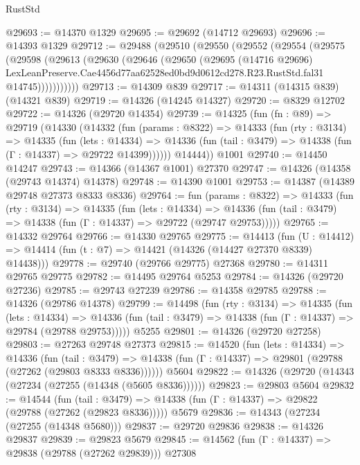 \begin{lexlean}{RustStd}
\begin{coremodule}
@29693 := @14370 @1329
@29695 := @29692 (@14712 @29693)
@29696 := @14393 @1329
@29712 := @29488
    (@29510
      (@29550
        (@29552
          (@29554
            (@29575
              (@29598
                (@29613
                  (@29630
                    (@29646
                      (@29650
                        (@29695
                          (@14716 @29696)
                          LexLeanPreserve.Cae4456d77aa62528ed0bd9d0612cd278.R23.RustStd.fal31
                          @14745)))))))))))
@29713 := @14309 @839
@29717 := @14311 (@14315 @839) (@14321 @839)
@29719 := @14326 (@14245 @14327)
@29720 := @8329 @12702
@29722 := @14326 (@29720 @14354)
@29739 := @14325
    (fun (fn : @89) =>
    @29719
      (@14330
        (@14332
          (fun (params : @8322) =>
          @14333
            (fun (rty : @3134) =>
            @14335
              (fun (lets : @14334) =>
              @14336 (fun (tail : @3479) => @14338 (fun (Γ : @14337) => @29722 @14399))))))
        @14444))
    @1001
@29740 := @14450 @14247
@29743 := @14366 (@14367 @1001) @27370
@29747 := @14326 (@14358 (@29743 @14374) @14378)
@29748 := @14390 @1001
@29753 := @14387 (@14389 @29748 @27373 @8333 @8336)
@29764 := fun (params : @8322) =>
  @14333
    (fun (rty : @3134) =>
    @14335
      (fun (lets : @14334) =>
      @14336 (fun (tail : @3479) => @14338 (fun (Γ : @14337) => @29722 (@29747 @29753)))))
@29765 := @14332 @29764
@29766 := @14330 @29765
@29775 := @14413
    (fun (U : @14412) => @14414 (fun (t : @7) => @14421 (@14326 (@14427 @27370 @8339) @14438)))
@29778 := @29740 (@29766 @29775) @27368
@29780 := @14311 @29765 @29775
@29782 := @14495 @29764 @5253
@29784 := @14326 (@29720 @27236)
@29785 := @29743 @27239
@29786 := @14358 @29785
@29788 := @14326 (@29786 @14378)
@29799 := @14498
    (fun (rty : @3134) =>
    @14335
      (fun (lets : @14334) =>
      @14336 (fun (tail : @3479) => @14338 (fun (Γ : @14337) => @29784 (@29788 @29753)))))
    @5255
@29801 := @14326 (@29720 @27258)
@29803 := @27263 @29748 @27373
@29815 := @14520
    (fun (lets : @14334) =>
    @14336
      (fun (tail : @3479) =>
      @14338 (fun (Γ : @14337) => @29801 (@29788 (@27262 (@29803 @8333 @8336))))))
    @5604
@29822 := @14326 (@29720 (@14343 (@27234 (@27255 (@14348 (@5605 @8336))))))
@29823 := @29803 @5604
@29832 := @14544
    (fun (tail : @3479) => @14338 (fun (Γ : @14337) => @29822 (@29788 (@27262 (@29823 @8336)))))
    @5679
@29836 := @14343 (@27234 (@27255 (@14348 @5680)))
@29837 := @29720 @29836
@29838 := @14326 @29837
@29839 := @29823 @5679
@29845 := @14562 (fun (Γ : @14337) => @29838 (@29788 (@27262 @29839))) @27308

\end{coremodule}
\end{lexlean}
